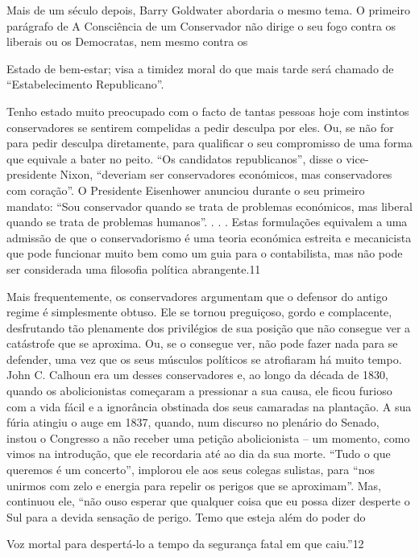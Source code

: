  \par 
Mais de um século depois, Barry Goldwater abordaria o mesmo tema. O primeiro parágrafo de A Consciência de um Conservador não dirige o seu fogo contra os liberais ou os Democratas, nem mesmo contra os
 \par 
Estado de bem-estar; visa a timidez moral do que mais tarde será chamado de “Estabelecimento Republicano”.
 \par 
Tenho estado muito preocupado com o facto de tantas pessoas hoje com instintos conservadores se sentirem compelidas a pedir desculpa por eles. Ou, se não for para pedir desculpa diretamente, para qualificar o seu compromisso de uma forma que equivale a bater no peito. “Os candidatos republicanos”, disse o vice-presidente Nixon, “deveriam ser conservadores económicos, mas conservadores com coração”. O Presidente Eisenhower anunciou durante o seu primeiro mandato: “Sou conservador quando se trata de problemas económicos, mas liberal quando se trata de problemas humanos”. . . . Estas formulações equivalem a uma admissão de que o conservadorismo é uma teoria económica estreita e mecanicista que pode funcionar muito bem como um guia para o contabilista, mas não pode ser considerada uma filosofia política abrangente.{\color{blue}11}
 \par 
Mais frequentemente, os conservadores argumentam que o defensor do antigo regime é simplesmente obtuso. Ele se tornou preguiçoso, gordo e complacente, desfrutando tão plenamente dos privilégios de sua posição que não consegue ver a catástrofe que se aproxima. Ou, se o consegue ver, não pode fazer nada para se defender, uma vez que os seus músculos políticos se atrofiaram há muito tempo. John C. Calhoun era um desses conservadores e, ao longo da década de 1830, quando os abolicionistas começaram a pressionar a sua causa, ele ficou furioso com a vida fácil e a ignorância obstinada dos seus camaradas na plantação. A sua fúria atingiu o auge em 1837, quando, num discurso no plenário do Senado, instou o Congresso a não receber uma petição abolicionista – um momento, como vimos na introdução, que ele recordaria até ao dia da sua morte. “Tudo o que queremos é um concerto”, implorou ele aos seus colegas sulistas, para “nos unirmos com zelo e energia para repelir os perigos que se aproximam”. Mas, continuou ele, “não ouso esperar que qualquer coisa que eu possa dizer desperte o Sul para a devida sensação de perigo. Temo que esteja além do poder do
 \par 
Voz mortal para despertá-lo a tempo da segurança fatal em que caiu.”{\color{blue}12}
